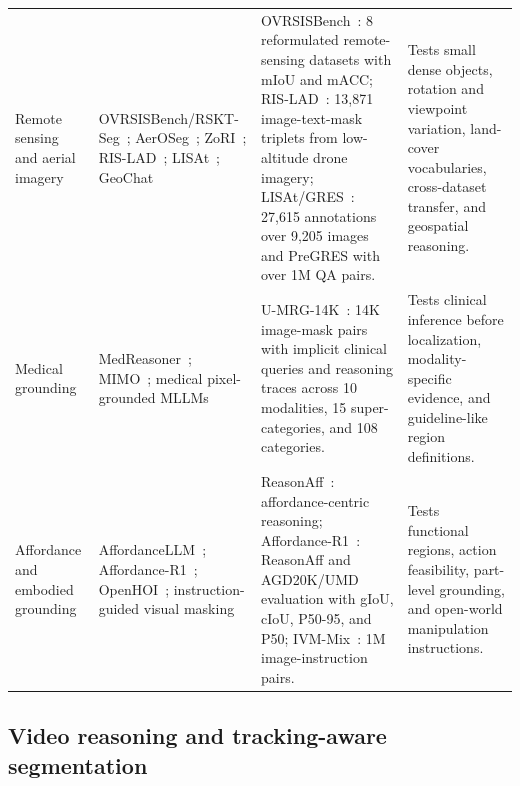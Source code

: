\begin{table}[t]
\begin{tabularx}{\textwidth}{>{\raggedright\arraybackslash}p{}>{\raggedright\arraybackslash}X>{\raggedright\arraybackslash}p{}>{\raggedright\arraybackslash}p{}}
Remote sensing and aerial imagery & OVRSISBench/RSKT-Seg~\citep{libExploringEfficientOpenvocabulary2026}; AerOSeg~\citep{sduttaAerosegHarnessingSam2025}; ZoRI~\citep{huangZoRIDiscriminativeZeroshot2025}; RIS-LAD~\citep{yeRISLADBenchmarkModel2026}; LISAt~\citep{quenumLisatLanguageinstructedSegmentation2026}; GeoChat~\citep{kuckrejaGeochatGroundedLarge2024} & OVRSISBench~\citep{libExploringEfficientOpenvocabulary2026}: 8 reformulated remote-sensing datasets with mIoU and mACC; RIS-LAD~\citep{yeRISLADBenchmarkModel2026}: 13,871 image-text-mask triplets from low-altitude drone imagery; LISAt/GRES~\citep{quenumLisatLanguageinstructedSegmentation2026}: 27,615 annotations over 9,205 images and PreGRES with over 1M QA pairs. & Tests small dense objects, rotation and viewpoint variation, land-cover vocabularies, cross-dataset transfer, and geospatial reasoning. \\
Medical grounding & MedReasoner~\citep{yanMedreasonerReinforcementLearning2026}; MIMO~\citep{chenMIMOMedicalVision2025}; medical pixel-grounded MLLMs & U-MRG-14K~\citep{yanMedreasonerReinforcementLearning2026}: 14K image-mask pairs with implicit clinical queries and reasoning traces across 10 modalities, 15 super-categories, and 108 categories. & Tests clinical inference before localization, modality-specific evidence, and guideline-like region definitions. \\
Affordance and embodied grounding & AffordanceLLM~\citep{qianAffordancellmGroundingAffordance2024}; Affordance-R1~\citep{wangAffordancer1ReinforcementLearning2026}; OpenHOI~\citep{zhangOpenhoiOpenworldHandobject2026}; instruction-guided visual masking~\citep{zhengInstructionguidedVisualMasking2024} & ReasonAff~\citep{wangAffordancer1ReinforcementLearning2026}: affordance-centric reasoning; Affordance-R1~\citep{wangAffordancer1ReinforcementLearning2026}: ReasonAff and AGD20K/UMD evaluation with gIoU, cIoU, P50-95, and P50; IVM-Mix~\citep{zhengInstructionguidedVisualMasking2024}: 1M image-instruction pairs. & Tests functional regions, action feasibility, part-level grounding, and open-world manipulation instructions. \\
\bottomrule
\end{tabularx}
\end{table}

\subsection{Video reasoning and tracking-aware segmentation}

